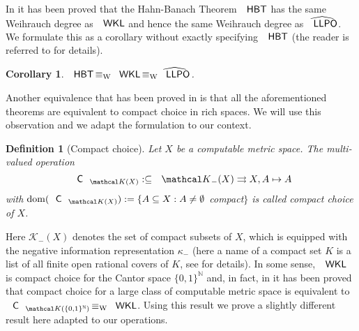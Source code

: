 \documentclass[jsl,10pt]{noasl}
\def\KK{{\mathcal K}}
\def\IN{{\mathbb{N}}}
\def\In{\subseteq}
\def\mto{\rightrightarrows}
\def\dom{{\rm dom}}
\def\LLPO{\text{\rm\sffamily LLPO}}
\def\WKL{\text{\rm\sffamily WKL}}
\def\HBT{\text{\rm\sffamily HBT}}
\def\C{\text{\rm\sffamily C}}
\def\LLPO{\text{\rm\sffamily LLPO}}
\def\equivW{\mathop{\equiv_{\mathrm{W}}}}
\newtheorem{definition}[proposition]{Definition}
\newtheorem{corollary}[proposition]{Corollary}
\begin{document}
In \cite{GM09} it has been proved that the Hahn-Banach Theorem $\HBT$ has
the same Weihrauch degree as $\WKL$ and hence the same Weihrauch degree as $\widehat{\LLPO}$.
We formulate this as a corollary without exactly specifying $\HBT$ (the reader
is referred to \cite{GM09} for details).

\begin{corollary}
\label{cor:hahn-banach}
$\HBT\equivW\WKL\equivW\widehat{\LLPO}$.
\end{corollary}

Another equivalence that has been proved in \cite{GM09} is that all the 
aforementioned theorems are equivalent to compact choice in rich spaces. 
We will use this observation and we adapt the formulation to our context.

\begin{definition}[Compact choice]\rm
Let $X$ be a computable metric space.
The multi-valued operation 
\[\C_{\KK(X)}:\In\KK_-(X)\mto X,A\mapsto A\]
with $\dom(\C_{\KK(X)}):=\{A\In X:A\not=\emptyset$ compact$\}$ is called {\em compact choice} of $X$.
\end{definition}

Here $\KK_-(X)$ denotes the set of compact subsets of $X$, which is equipped
with the negative information representation $\kappa_-$ 
(here a name of a compact set $K$ is a list of all finite open rational covers of $K$, 
see \cite{BP03} for details).
In some sense, $\WKL$ is compact choice for the Cantor space $\{0,1\}^\IN$ and,
in fact, in \cite{GM09} it has been proved that compact choice for a large class
of computable metric space is equivalent to $\C_{\KK(\{0,1\}^\IN)}\equivW\WKL$.
Using this result we prove a slightly different result here adapted to our operations.
\end{document}
